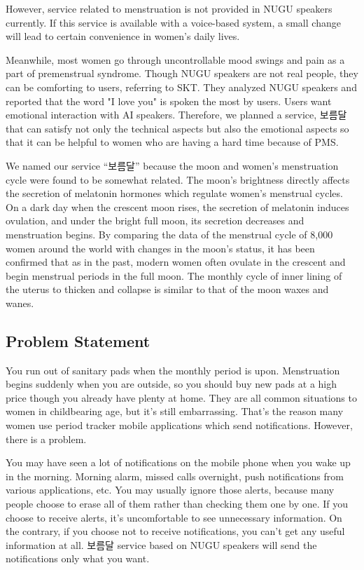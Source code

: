 \documentclass[conference]{IEEEtran}
\begin{document}
However, service related to menstruation is not provided in NUGU speakers currently. If this service is available with a voice-based system, a small change will lead to certain convenience in women's daily lives.

Meanwhile, most women go through uncontrollable mood swings and pain as a part of premenstrual syndrome. Though NUGU speakers are not real people, they can be comforting to users, referring to SKT. They analyzed NUGU speakers and reported that the word "I love you" is spoken the most by users. Users want emotional interaction with AI speakers. Therefore, we planned a service, 보름달 that can satisfy not only the technical aspects but also the emotional aspects so that it can be helpful to women who are having a hard time because of PMS. 

We named our service “보름달” because the moon and women's menstruation cycle were found to be somewhat related. The moon's brightness directly affects the secretion of melatonin hormones which regulate women's menstrual cycles. On a dark day when the crescent moon rises, the secretion of melatonin induces ovulation, and under the bright full moon, its secretion decreases and menstruation begins. By comparing the data of the menstrual cycle of 8,000 women around the world with changes in the moon's status, it has been confirmed that as in the past, modern women often ovulate in the crescent and begin menstrual periods in the full moon\cite{b2}. The monthly cycle of inner lining of the uterus to thicken and collapse is similar to that of the moon waxes and wanes.
\subsection{Problem Statement}
You run out of sanitary pads when the monthly period is upon. Menstruation begins suddenly when you are outside, so you should buy new pads at a high price though you already have plenty at home. They are all common situations to women in childbearing age, but it's still embarrassing. That’s the reason many women use period tracker mobile applications which send notifications. However, there is a problem. 

You may have seen a lot of notifications on the mobile phone when you wake up in the morning. Morning alarm, missed calls overnight, push notifications from various applications, etc. You may usually ignore those alerts, because many people choose to erase all of them rather than checking them one by one. If you choose to receive alerts, it's uncomfortable to see unnecessary information. On the contrary, if you choose not to receive notifications, you can't get any useful information at all. 보름달 service based on NUGU speakers will send the notifications only what you want.
\end{document}
